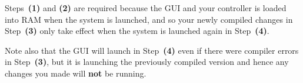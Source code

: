 \documentclass[]{report}
\begin{document}
	\vspace{0.3cm}
	
	\noindent
	Steps~\textbf{(1)} and \textbf{(2)} are required because the GUI and your controller is loaded into RAM when the system is launched, and so your newly compiled changes in Step~\textbf{(3)} only take effect when the system is launched again in Step~\textbf{(4)}.
	
	\vspace{0.3cm}
	
	\noindent
	Note also that the GUI will launch in Step~\textbf{(4)} even if there were compiler errors in Step~\textbf{(3)}, but it is launching the previously compiled version and hence any changes you made will \textbf{not} be running.
	
\end{document}
